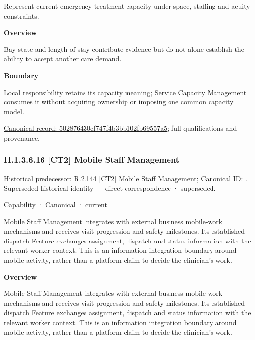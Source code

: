 Represent current emergency treatment capacity under space, staffing and acuity constraints.



\textbf{Overview}



Bay state and length of stay contribute evidence but do not alone establish the ability to accept another care demand.



\textbf{Boundary}



Local responsibility retains its capacity meaning; Service Capacity Management consumes it without acquiring ownership or imposing one common capacity model.


{\footnotesize \href{../../../../../../../continuum/strategy/capability/feature/502876430cf747f4b3bb102fb69557a5.md}{Canonical record: 502876430cf747f4b3bb102fb69557a5}; full qualifications and provenance.}\par
\subsubsection*{II.1.3.6.16 [CT2] Mobile Staff Management}
\label{navigation:II.1.3.6.16}

{\small Historical predecessor: R.2.144 \hyperref[element:32118856636f400a95fc28daacea61c8]{[CT2] Mobile Staff Management}; Canonical ID: \texttt{}. Superseded historical identity — direct correspondence · superseded.}\par
\label{element:79a4a48fddf74c69acf7e16404d06ea5}
{\small Capability · Canonical · current}\par

Mobile Staff Management integrates with external business mobile-work mechanisms and receives visit progression and safety milestones. Its established dispatch Feature exchanges assignment, dispatch and status information with the relevant worker context. This is an information integration boundary around mobile activity, rather than a platform claim to decide the clinician's work.



\textbf{Overview}



Mobile Staff Management integrates with external business mobile-work mechanisms and receives visit progression and safety milestones. Its established dispatch Feature exchanges assignment, dispatch and status information with the relevant worker context. This is an information integration boundary around mobile activity, rather than a platform claim to decide the clinician's work.



